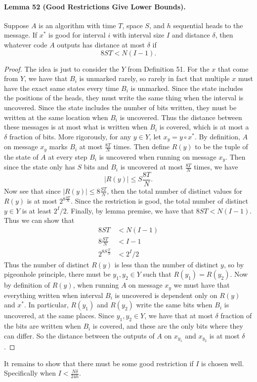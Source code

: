\documentclass[10pt,a4paper]{article}
\begin{document}
\paragraph{Lemma 52 (Good Restrictions Give Lower Bounds).} Suppose $A$ is an algorithm with time $T$, space $S$, and $h$ sequential heads to the message. If $x^*$ is good for interval $i$ with interval size $I$ and distance $\delta$, then whatever code $A$ outputs has distance at most $\delta$ if
\[8ST<N(I-1).\]
\begin{proof}
The idea is just to consider the $Y$ from Definition 51. For the $x$ that come from $Y$, we have that $B_i$ is unmarked rarely, so rarely in fact that multiple $x$ must have the exact same states every time $B_i$ is unmarked. Since the state includes the positions of the heads, they must write the same thing when the interval is uncovered. Since the state includes the number of bits written, they must be written at the same location when $B_i$ is uncovered. Thus the distance between these messages is at most what is written when $B_i$ is covered, which is at most a $\delta$ fraction of bits.
More rigorously, for any $y\in Y$, let $x_y=y\circ x^*$. By definition, $A$ on message $x_y$ marks $B_i$ at most $\frac{8T}N$ times. Then define $R(y)$ to be the tuple of the state of $A$ at every step $B_i$ is uncovered when running on message $x_y$. Then since the state only has $S$ bits and $B_i$ is uncovered at most $\frac{8T}N$ times, we have
\[|R(y)|\le S\frac{8T}N.\]
Now see that since $|R(y)|\le8\frac{ST}N$, then the total number of distinct values for $R(y)$ is at most $2^{8\frac{ST}N}$. Since the restriction is good, the total number of distinct $y\in Y$ is at least $2^I/2$. Finally, by lemma premise, we have that $8ST<N(I-1)$. Thus we can show that
\begin{align*}8ST&<N(I-1)\\8\frac{ST}N&<I-1\\2^{8S\frac TN}&<2^I/2\end{align*}
Thus the number of distinct $R(y)$ is less than the number of distinct $y$, so by pigeonhole principle, there must be $y_1,y_2\in Y$ such that $R(y_1)=R(y_2)$.
Now by definition of $R(y)$, when running $A$ on message $x_y$ we must have that everything written when interval $B_i$ is uncovered is dependent only on $R(y)$ and $x^*$. In particular, $R(y_1)$ and $R(y_2)$ write the same bits when $B_i$ is uncovered, at the same places.
Since $y_1,y_2\in Y$, we have that at most $\delta$ fraction of the bits are written when $B_i$ is covered, and these are the only bits where they can differ. So the distance between the outputs of $A$ on $x_{y_1}$ and $x_{y_2}$ is at most $\delta$.
\end{proof}
It remains to show that there must be some good restriction if $I$ is chosen well. Specifically when $I<\frac{N\delta}{24h}$.
\end{document}
